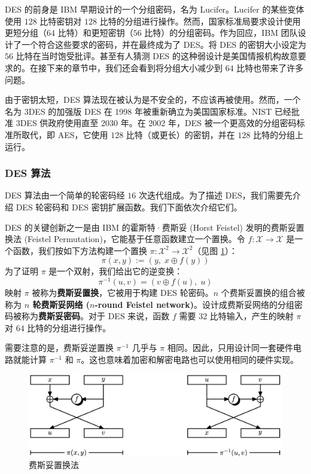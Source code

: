 DES 的前身是 IBM 早期设计的一个分组密码，名为 Lucifer。Lucifer 的某些变体使用 $128$ 比特密钥对 $128$ 比特的分组进行操作。然而，国家标准局要求设计使用更短分组（$64$ 比特）和更短密钥（$56$ 比特）的分组密码。作为回应，IBM 团队设计了一个符合这些要求的密码，并在最终成为了 DES。将 DES 的密钥大小设定为 $56$ 比特在当时饱受批评。甚至有人猜测 DES 的这种弱设计是美国情报机构故意要求的。在接下来的章节中，我们还会看到将分组大小减少到 $64$ 比特也带来了许多问题。

由于密钥太短，DES 算法现在被认为是不安全的，不应该再被使用。然而，一个名为 3DES 的加强版 DES 在 1998 年被重新确立为美国国家标准。NIST 已经批准 3DES 供政府使用直至 2030 年。在 2002 年，DES 被一个更高效的分组密码标准所取代，即 AES，它使用 $128$ 比特（或更长）的密钥，并在 $128$ 比特的分组上运行。

\subsubsection{DES 算法}

DES 算法由一个简单的轮密码经 $16$ 次迭代组成。为了描述 DES，我们需要先介绍 DES 轮密码和 DES 密钥扩展函数。我们下面依次介绍它们。

\begin{snote}[费斯妥置换法。]
DES 的关键创新之一是由 IBM 的霍斯特·费斯妥 (Horst Feistel) 发明的费斯妥置换法 (Feistel Permutation)，它能基于任意函数建立一个置换。令 $f:\mathcal{X}\to\mathcal{X}$ 是一个函数，我们按如下方法构建一个置换 $\pi:\mathcal{X}^2\to\mathcal{X}^2$（见图 \ref{fig:4-7}）：
\[
\pi(x,y):=(y,\;x\oplus f(y))
\]
为了证明 $\pi$ 是一个双射，我们给出它的逆变换：
\[
\pi^{-1}(u,v)=(v\oplus f(u),\;u)
\]
映射 $\pi$ 被称为\textbf{费斯妥置换}，它被用于构建 DES 轮密码。$n$ 个费斯妥置换的组合被称为 \textbf{$n$ 轮费斯妥网络 ($n$-round Feistel network)}。设计成费斯妥网络的分组密码被称为\textbf{费斯妥密码}。对于 DES 来说，函数 $f$ 需要 $32$ 比特输入，产生的映射 $\pi$ 对 $64$ 比特的分组进行操作。

需要注意的是，费斯妥逆置换 $\pi^{-1}$ 几乎与 $\pi$ 相同。因此，只用设计同一套硬件电路就能计算 $\pi^{-1}$ 和 $\pi$。这也意味着加密和解密电路也可以使用相同的硬件实现。
\end{snote}

\begin{figure}
  \centering
  \includegraphics[width=0.7\linewidth]{figures/chapter4/fig7.png}
  \caption{费斯妥置换法}
  \label{fig:4-7}
\end{figure}


